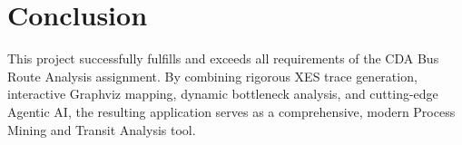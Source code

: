 \documentclass[12pt,a4paper]{article}
\begin{document}
\section{Conclusion}
This project successfully fulfills and exceeds all requirements of the CDA Bus Route Analysis assignment. By combining rigorous XES trace generation, interactive Graphviz mapping, dynamic bottleneck analysis, and cutting-edge Agentic AI, the resulting application serves as a comprehensive, modern Process Mining and Transit Analysis tool.
\end{document}
